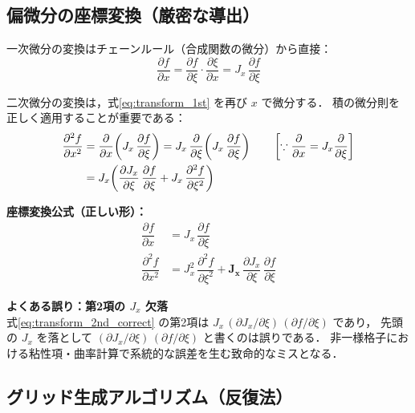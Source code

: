 \documentclass[12pt, a4paper, titlepage]{article}
\newcommand{\jp}[1]{{\normalfont\jpfont #1}}
\newcommand{\pd}[2]{\dfrac{\partial #1}{\partial #2}}
\newcommand{\pdd}[2]{\dfrac{\partial^2 #1}{\partial #2^2}}
\begin{document}
\subsection{\jp{偏微分の座標変換（厳密な導出）}}
\label{sec:coord_transform}

\jp{一次微分の変換はチェーンルール（合成関数の微分）から直接：}
\begin{equation}
  \pd{f}{x} = \pd{f}{\xi}\cdot\pd{\xi}{x} = J_x\,\pd{f}{\xi}
  \label{eq:transform_1st}
\end{equation}

\jp{二次微分の変換は，式\eqref{eq:transform_1st} を再び $x$ で微分する．
積の微分則を正しく適用することが重要である：}
\begin{align}
  \pdd{f}{x}
  &= \pd{}{x}\!\left(J_x\,\pd{f}{\xi}\right)
  = J_x\,\pd{}{\xi}\!\left(J_x\,\pd{f}{\xi}\right)
  \qquad\left[\because \pd{}{x} = J_x\pd{}{\xi}\right] \notag\\
  &= J_x\!\left(\pd{J_x}{\xi}\,\pd{f}{\xi} + J_x\,\pdd{f}{\xi}\right)
\end{align}

\begin{tcolorbox}[resultbox]
\textbf{\jp{座標変換公式（正しい形）：}}
\begin{align}
  \pd{f}{x} &= J_x\,\pd{f}{\xi}
  \label{eq:transform_1st_correct}\\[6pt]
  \pdd{f}{x} &= J_x^2\,\pdd{f}{\xi} + \mathbf{J_x}\,\pd{J_x}{\xi}\,\pd{f}{\xi}
  \label{eq:transform_2nd_correct}
\end{align}
\end{tcolorbox}

\begin{tcolorbox}[warnbox]
\textbf{\jp{よくある誤り：第2項の $J_x$ 欠落}}\\
\jp{式\eqref{eq:transform_2nd_correct} の第2項は
$J_x\,(\partial J_x/\partial\xi)\,(\partial f/\partial\xi)$ であり，
先頭の $J_x$ を落として
$(\partial J_x/\partial\xi)\,(\partial f/\partial\xi)$ と書くのは誤りである．
非一様格子における粘性項・曲率計算で系統的な誤差を生む致命的なミスとなる．}
\end{tcolorbox}

\subsection{\jp{グリッド生成アルゴリズム（反復法）}}
\end{document}
